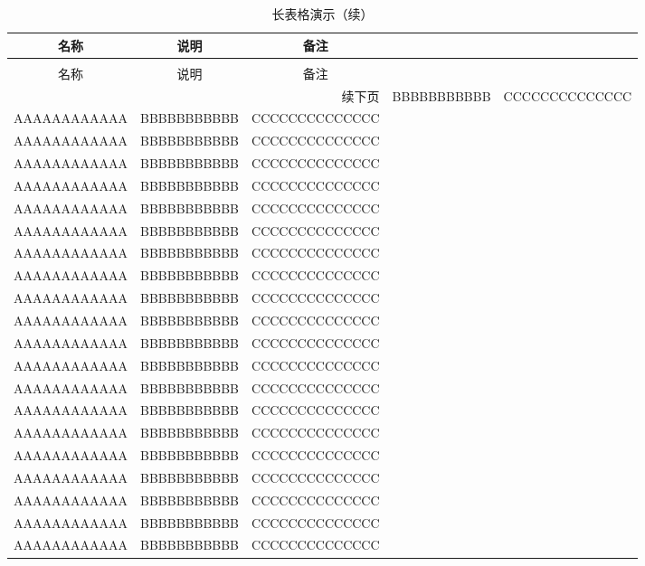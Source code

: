 \begin{longtable}[h]{ccc}
  \caption[长表格演示]{长表格演示}
  \label{tab:longtable}\\
  \toprule
  名称  & 说明 & 备注\\
  \midrule
  \endfirsthead
  \caption[]{长表格演示（续）} \\
  \toprule
  名称  & 说明 & 备注 \\
  \midrule
  \endhead
  \hline
  \multicolumn{3}{r}{\small 续下页}
  \endfoot
  \bottomrule
  \endlastfoot

  AAAAAAAAAAAA   &   BBBBBBBBBBB   &   CCCCCCCCCCCCCC   \\
  AAAAAAAAAAAA   &   BBBBBBBBBBB   &   CCCCCCCCCCCCCC   \\
  AAAAAAAAAAAA   &   BBBBBBBBBBB   &   CCCCCCCCCCCCCC   \\
  AAAAAAAAAAAA   &   BBBBBBBBBBB   &   CCCCCCCCCCCCCC   \\
  AAAAAAAAAAAA   &   BBBBBBBBBBB   &   CCCCCCCCCCCCCC   \\
  AAAAAAAAAAAA   &   BBBBBBBBBBB   &   CCCCCCCCCCCCCC   \\
  AAAAAAAAAAAA   &   BBBBBBBBBBB   &   CCCCCCCCCCCCCC   \\
  AAAAAAAAAAAA   &   BBBBBBBBBBB   &   CCCCCCCCCCCCCC   \\
  AAAAAAAAAAAA   &   BBBBBBBBBBB   &   CCCCCCCCCCCCCC   \\
  AAAAAAAAAAAA   &   BBBBBBBBBBB   &   CCCCCCCCCCCCCC   \\
  AAAAAAAAAAAA   &   BBBBBBBBBBB   &   CCCCCCCCCCCCCC   \\
  AAAAAAAAAAAA   &   BBBBBBBBBBB   &   CCCCCCCCCCCCCC   \\
  AAAAAAAAAAAA   &   BBBBBBBBBBB   &   CCCCCCCCCCCCCC   \\
  AAAAAAAAAAAA   &   BBBBBBBBBBB   &   CCCCCCCCCCCCCC   \\
  AAAAAAAAAAAA   &   BBBBBBBBBBB   &   CCCCCCCCCCCCCC   \\
  AAAAAAAAAAAA   &   BBBBBBBBBBB   &   CCCCCCCCCCCCCC   \\
  AAAAAAAAAAAA   &   BBBBBBBBBBB   &   CCCCCCCCCCCCCC   \\
  AAAAAAAAAAAA   &   BBBBBBBBBBB   &   CCCCCCCCCCCCCC   \\
  AAAAAAAAAAAA   &   BBBBBBBBBBB   &   CCCCCCCCCCCCCC   \\
  AAAAAAAAAAAA   &   BBBBBBBBBBB   &   CCCCCCCCCCCCCC   \\
  AAAAAAAAAAAA   &   BBBBBBBBBBB   &   CCCCCCCCCCCCCC   \\

\end{longtable}

